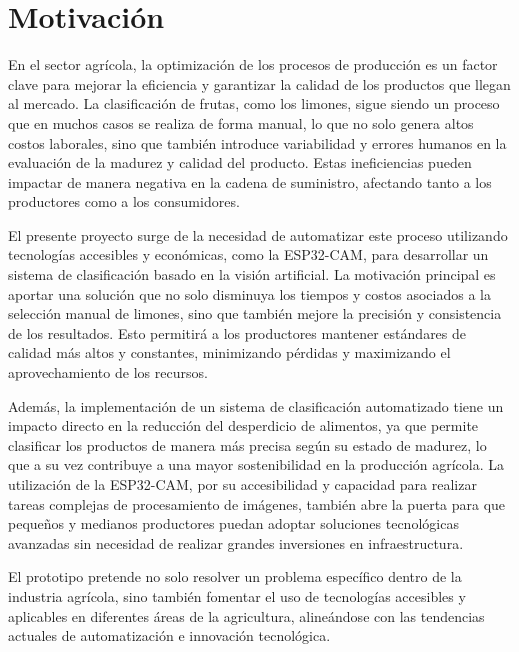\section{Motivación}



En el sector agrícola, la optimización de los procesos de producción es un factor clave para mejorar la eficiencia y garantizar la calidad de los productos que llegan al mercado. La clasificación de frutas, como los limones, sigue siendo un proceso que en muchos casos se realiza de forma manual, lo que no solo genera altos costos laborales, sino que también introduce variabilidad y errores humanos en la evaluación de la madurez y calidad del producto. Estas ineficiencias pueden impactar de manera negativa en la cadena de suministro, afectando tanto a los productores como a los consumidores.

El presente proyecto surge de la necesidad de automatizar este proceso utilizando tecnologías accesibles y económicas, como la ESP32-CAM, para desarrollar un sistema de clasificación basado en la visión artificial. La motivación principal es aportar una solución que no solo disminuya los tiempos y costos asociados a la selección manual de limones, sino que también mejore la precisión y consistencia de los resultados. Esto permitirá a los productores mantener estándares de calidad más altos y constantes, minimizando pérdidas y maximizando el aprovechamiento de los recursos.

Además, la implementación de un sistema de clasificación automatizado tiene un impacto directo en la reducción del desperdicio de alimentos, ya que permite clasificar los productos de manera más precisa según su estado de madurez, lo que a su vez contribuye a una mayor sostenibilidad en la producción agrícola. La utilización de la ESP32-CAM, por su accesibilidad y capacidad para realizar tareas complejas de procesamiento de imágenes, también abre la puerta para que pequeños y medianos productores puedan adoptar soluciones tecnológicas avanzadas sin necesidad de realizar grandes inversiones en infraestructura.

El prototipo pretende no solo resolver un problema específico dentro de la industria agrícola, sino también fomentar el uso de tecnologías accesibles y aplicables en diferentes áreas de la agricultura, alineándose con las tendencias actuales de automatización e innovación tecnológica.
